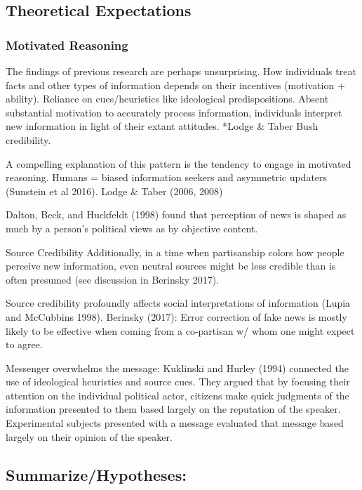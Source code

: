 \documentclass[11pt,article,oneside]{memoir}
\begin{document}
\hypertarget{theoretical-expectations}{%
\subsection{Theoretical Expectations}\label{theoretical-expectations}}

\hypertarget{motivated-reasoning}{%
\subsubsection{Motivated Reasoning}\label{motivated-reasoning}}

The findings of previous research are perhaps unsurprising. How
individuals treat facts and other types of information depends on their
incentives (motivation + ability). Reliance on cues/heuristics like
ideological predispositions. Absent substantial motivation to accurately
process information, individuals interpret new information in light of
their extant attitudes. *Lodge \& Taber Bush credibility.

A compelling explanation of this pattern is the tendency to engage in
motivated reasoning. Humans = biased information seekers
\autocite{kunda1990case} and asymmetric updaters (Sunstein et al 2016).
\textcite{Taber2006} Lodge \& Taber (2006, 2008)

Dalton, Beck, and Huckfeldt (1998) found that perception of news is
shaped as much by a person's political views as by objective content.

Source Credibility Additionally, in a time when partisanship colors how
people perceive new information, even neutral sources might be less
credible than is often presumed (see discussion in Berinsky 2017).
\textcite{berinsky2018telling}

Source credibility profoundly affects social interpretations of
information (Lupia and McCubbins 1998). Berinsky (2017): Error
correction of fake news is mostly likely to be effective when coming
from a co-partisan w/ whom one might expect to agree.

Messenger overwhelms the message: Kuklinski and Hurley (1994) connected
the use of ideological heuristics and source cues. They argued that by
focusing their attention on the individual political actor, citizens
make quick judgments of the information presented to them based largely
on the reputation of the speaker. Experimental subjects presented with a
message evaluated that message based largely on their opinion of the
speaker.

\hypertarget{summarizehypotheses}{%
\subsection{Summarize/Hypotheses:}\label{summarizehypotheses}}
\end{document}
